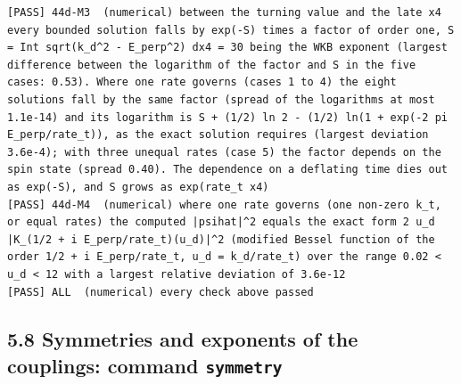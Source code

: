 \documentclass[
  10pt,
]{article}
\begin{document}
\begin{verbatim}
[PASS] 44d-M3  (numerical) between the turning value and the late x4 every bounded solution falls by exp(-S) times a factor of order one, S = Int sqrt(k_d^2 - E_perp^2) dx4 = 30 being the WKB exponent (largest difference between the logarithm of the factor and S in the five cases: 0.53). Where one rate governs (cases 1 to 4) the eight solutions fall by the same factor (spread of the logarithms at most 1.1e-14) and its logarithm is S + (1/2) ln 2 - (1/2) ln(1 + exp(-2 pi E_perp/rate_t)), as the exact solution requires (largest deviation 3.6e-4); with three unequal rates (case 5) the factor depends on the spin state (spread 0.40). The dependence on a deflating time dies out as exp(-S), and S grows as exp(rate_t x4)
[PASS] 44d-M4  (numerical) where one rate governs (one non-zero k_t, or equal rates) the computed |psihat|^2 equals the exact form 2 u_d |K_(1/2 + i E_perp/rate_t)(u_d)|^2 (modified Bessel function of the order 1/2 + i E_perp/rate_t, u_d = k_d/rate_t) over the range 0.02 < u_d < 12 with a largest relative deviation of 3.6e-12
[PASS] ALL  (numerical) every check above passed
\end{verbatim}

\hypertarget{symmetries-and-exponents-of-the-couplings-command-symmetry}{%
\subsection{\texorpdfstring{5.8 Symmetries and exponents of the
couplings: command
\texttt{symmetry}}{5.8 Symmetries and exponents of the couplings: command symmetry}}\label{symmetries-and-exponents-of-the-couplings-command-symmetry}}
\end{document}
